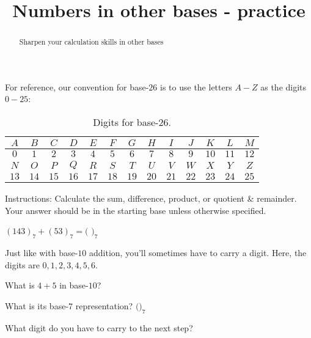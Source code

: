 \documentclass[handout,numbers]{ximera}
\title{Numbers in other bases - practice}
\begin{document}
\begin{abstract} {Sharpen your calculation skills in other bases}
\end{abstract}
\maketitle

For reference, our convention for base-$26$ is to use the letters $A-Z$ as the digits $0-25$:

\begin{table}
\centering
\caption{Digits for base-$26$.}
\begin{tabular}{|c|c|c|c|c|c|c|c|c|c|c|c|c|}
\hline
 $A$ & $B$ & $C$ & $D$ & $E$ & $F$ & $G$ & $H$ & $I$ & $J$ & $K$ & $L$ & $M$  \\
 \hline
$0$ & $1$ & $2$ & $3$ & $4$ & $5$ & $6$ & $7$ & $8$ & $9$ & $10$ & $11$ & $12$ \\
\hline
\hline
$N$ & $O$ & $P$ & $Q$ & $R$ & $S$ & $T$ & $U$ & $V$ & $W$ & $X$ & $Y$ & $Z$\\
\hline
$13$ & $14$ & $15$ & $16$ & $17$ & $18$ & $19$ & $20$ & $21$ & $22$ & $23$ & $24$ & $25$ \\
\hline
\end{tabular}
\end{table}

Instructions: Calculate the sum, difference, product, or quotient \& remainder.  Your answer should be in the starting base unless otherwise specified.

\begin{question}
	$(143)_7 + (53)_7 = ($ \qquad\qquad {}$)_7$
	\begin{hint} 
		Just like with base-$10$ addition, you'll sometimes have to carry a digit.  Here, the digits are $0, 1, 2, 3, 4, 5, 6$.

		\begin{prompt} 
			What is $4+5$ in base-$10$? \qquad\qquad {}
		\end{prompt}

		\begin{prompt} 
			What is its base-$7$ representation? $($\qquad\qquad \answer{(12)}$)_7$
		\end{prompt}

		\begin{prompt} 
			What digit do you have to carry to the next step? \answer{1}
		\end{prompt}
	\end{hint}
\end{question}
\end{document}
